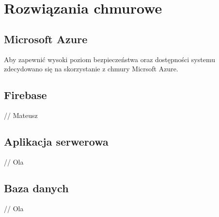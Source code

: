 \chapter{Rozwiązania chmurowe}

\section{Microsoft Azure}

Aby zapewnić wysoki poziom bezpieczeństwa oraz dostępności systemu zdecydowano się na skorzystanie z chmury Micrsoft Azure.

\section{Firebase}

// Mateusz

\section{Aplikacja serwerowa}

// Ola

\section{Baza danych}

// Ola
